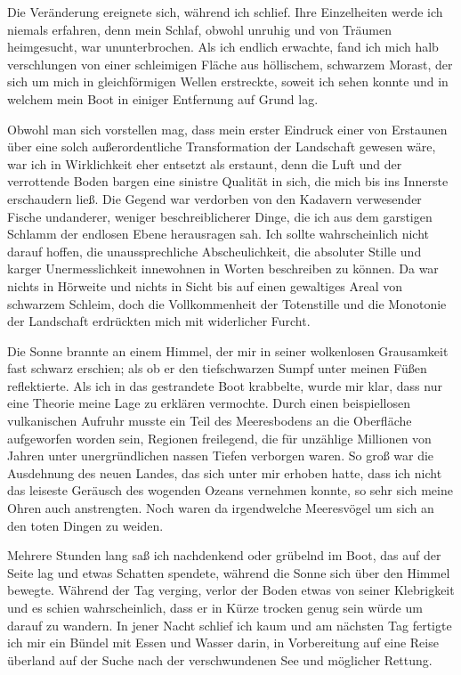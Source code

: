 \documentclass[a4paper]{memoir}
\begin{document}
Die Veränderung ereignete sich, während ich schlief. Ihre Einzelheiten werde ich niemals erfahren, denn mein Schlaf, obwohl unruhig und von Träumen heimgesucht, war ununterbrochen. Als ich endlich erwachte, fand ich mich halb verschlungen von einer schleimigen Fläche aus höllischem, schwarzem Morast, der sich um mich in gleichförmigen Wellen erstreckte, soweit ich sehen konnte und in welchem mein Boot in einiger Entfernung auf Grund lag.

Obwohl man sich vorstellen mag, dass mein erster Eindruck einer von Erstaunen über eine solch außerordentliche Transformation der Landschaft gewesen wäre, war ich in Wirklichkeit eher entsetzt als erstaunt, denn die Luft und der verrottende Boden bargen eine sinistre Qualität in sich, die mich bis ins Innerste erschaudern ließ. Die Gegend war verdorben von den Kadavern verwesender Fische undanderer, weniger beschreiblicherer Dinge, die ich aus dem garstigen Schlamm der endlosen Ebene herausragen sah. Ich sollte wahrscheinlich nicht darauf hoffen, die unaussprechliche Abscheulichkeit, die absoluter Stille und karger Unermesslichkeit innewohnen in Worten beschreiben zu können. Da war nichts in Hörweite und nichts in Sicht bis auf einen gewaltiges Areal von schwarzem Schleim, doch die Vollkommenheit der Totenstille und die Monotonie der Landschaft erdrückten mich mit widerlicher Furcht.

Die Sonne brannte an einem Himmel, der mir in seiner wolkenlosen Grausamkeit fast schwarz erschien; als ob er den tiefschwarzen Sumpf unter meinen Füßen reflektierte. Als ich in das gestrandete Boot krabbelte, wurde mir klar, dass nur eine Theorie meine Lage zu erklären vermochte. Durch einen beispiellosen vulkanischen Aufruhr musste ein Teil des Meeresbodens an die Oberfläche aufgeworfen worden sein, Regionen freilegend, die für unzählige Millionen von Jahren unter unergründlichen nassen Tiefen verborgen waren. So groß war die Ausdehnung des neuen Landes, das sich unter mir erhoben hatte, dass ich nicht das leiseste Geräusch des wogenden Ozeans vernehmen konnte, so sehr sich meine Ohren auch anstrengten. Noch waren da irgendwelche Meeresvögel um sich an den toten Dingen zu weiden.

Mehrere Stunden lang saß ich nachdenkend oder grübelnd im Boot, das auf der Seite lag und etwas Schatten spendete, während die Sonne sich über den Himmel bewegte. Während der Tag verging, verlor der Boden etwas von seiner Klebrigkeit und es schien wahrscheinlich, dass er in Kürze trocken genug sein würde um darauf zu wandern. In jener Nacht schlief ich kaum und am nächsten Tag fertigte ich mir ein Bündel mit Essen und Wasser darin, in Vorbereitung auf eine Reise überland auf der Suche nach der verschwundenen See und möglicher Rettung.
\end{document}
